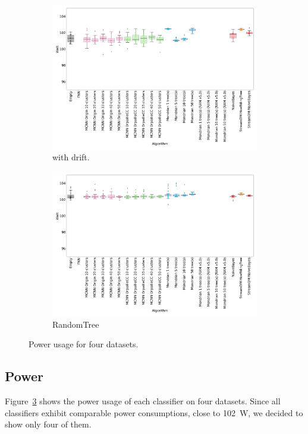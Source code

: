 \begin{figure}
\begin{subfigure}[t]{.49\linewidth}
		\includegraphics[width=\linewidth]{figures/results/drift_3_watt.png}
		\caption{\banosdataset with drift.}
		\label{fig:power-drift}
	\end{subfigure}
	\hfill
	\begin{subfigure}[t]{.49\linewidth}
		\includegraphics[width=\linewidth]{figures/results/dataset_3_watt.png}
		\caption{RandomTree}
		\label{fig:power-dataset_3}
	\end{subfigure}
	\caption{Power usage for four datasets.}
	\label{fig:power}
\end{figure}
\subsection{Power}
\label{sec:result-power}
Figure~\ref{fig:power} shows the power usage of each classifier on four
datasets. Since all classifiers
exhibit comparable power consumptions, close to 102~W, we decided to show only
four of them.


